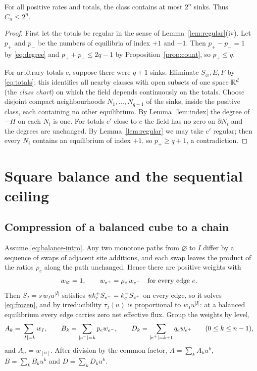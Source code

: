 \begin{theorem}\label{thm:upper}
For all positive rates and totals, the class contains at most \(2^n\) sinks. Thus \(C_n\le2^n\).
\end{theorem}
\begin{proof}
First let the totals be regular in the sense of Lemma~\ref{lem:regular}(iv). Let \(p_+\) and
\(p_-\) be the numbers of equilibria of index \(+1\) and \(-1\). Then \(p_+-p_-=1\) by
\eqref{eq:degree} and \(p_++p_-\le2q-1\) by Proposition~\ref{prop:count}, so \(p_+\le q\).

For arbitrary totals \(c\), suppose there were \(q+1\) sinks. Eliminate \(S_\varnothing,E,F\)
by \eqref{eq:totals}; this identifies all nearby classes with open subsets of one space
\(\mathbb R^d\) (the \emph{class chart}) on which the field depends continuously on the totals.
Choose disjoint compact neighbourhoods \(N_1,\dots,N_{q+1}\) of the sinks, inside the positive
class, each containing no other equilibrium. By Lemma~\ref{lem:index} the degree of \(-H\) on
each \(N_i\) is one. For totals \(c'\) close to \(c\) the field has no zero on
\(\partial N_i\) and the degrees are unchanged. By Lemma~\ref{lem:regular} we may take \(c'\)
regular; then every \(N_i\) contains an equilibrium of index \(+1\), so \(p_+\ge q+1\), a
contradiction.
\end{proof}

\section{Square balance and the sequential ceiling}\label{sec:balance}

\subsection{Compression of a balanced cube to a chain}
Assume \eqref{eq:balance-intro}. Any two monotone paths from \(\varnothing\) to \(I\) differ by
a sequence of swaps of adjacent site additions, and each swap leaves the product of the ratios
\(\rho_e\) along the path unchanged. Hence there are positive weights with
\begin{equation}\label{eq:weights}
 w_\varnothing=1,\qquad w_{e^{+}}=\rho_e\,w_{e^{-}}\quad\text{for every edge }e .
\end{equation}
Then \(S_I=s\,w_Iu^{|I|}\) satisfies \(uk_e^+S_{e^{-}}=k_e^-S_{e^{+}}\) on every edge, so it
solves \eqref{eq:frozen}, and by irreducibility \(\tau_I(u)\) is proportional to
\(w_Iu^{|I|}\): at a balanced equilibrium every edge carries zero net effective flux. Group the
weights by level,
\begin{equation}\label{eq:levels}
 A_k=\sum_{|I|=k}w_I,\qquad B_k=\sum_{|e^{-}|=k}p_ew_{e^{-}},\qquad
 D_k=\sum_{|e^{+}|=k+1}q_ew_{e^{+}}\qquad(0\le k\le n-1),
\end{equation}
and \(A_n=w_{[n]}\). After division by the common factor, \(A=\sum_kA_ku^k\),
\(B=\sum_kB_ku^k\) and \(D=\sum_kD_ku^k\).


